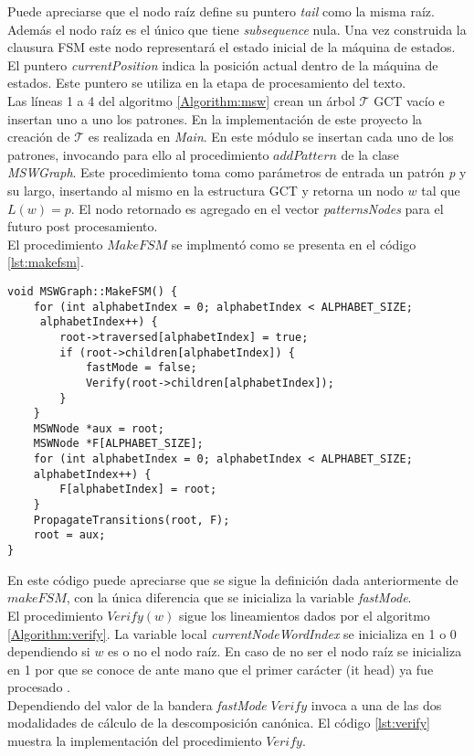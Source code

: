 Puede apreciarse que el nodo raíz define su puntero {\it tail} como la misma raíz. Además el nodo raíz es el único que tiene {\it subsequence} nula. 
Una vez construida la clausura FSM este nodo representará el estado inicial de la máquina de estados. \\
El puntero {\it currentPosition} indica la posición actual dentro de la máquina de estados. Este puntero se utiliza en la etapa de procesamiento del texto.\\
Las líneas 1 a 4 del algoritmo \ref{Algorithm:msw} crean un árbol $\mathcal{T}$ GCT vacío e insertan uno a uno los patrones. En la implementación de este proyecto la creación de $\mathcal{T}$ es realizada en \emph{Main}. En este módulo se insertan cada uno de los patrones, invocando para ello al procedimiento $addPattern$ de la clase \emph{MSWGraph}. Este procedimiento toma como parámetros de entrada un patrón \emph{p} y su largo, insertando al mismo en la estructura GCT y retorna un nodo $w$ tal que $L(w) = p$. El nodo retornado es agregado en el vector {\it patternsNodes} para el futuro post procesamiento.\\
El procedimiento $MakeFSM$ se implmentó como se presenta en el código \ref{lst:makefsm}.
\begin{lstlisting}[caption=Procedimiento $MakeFSM$, label={lst:makefsm}]
void MSWGraph::MakeFSM() {
	for (int alphabetIndex = 0; alphabetIndex < ALPHABET_SIZE;
	 alphabetIndex++) {
		root->traversed[alphabetIndex] = true;
		if (root->children[alphabetIndex]) {
			fastMode = false;
			Verify(root->children[alphabetIndex]);
		}
	}
	MSWNode *aux = root;
	MSWNode *F[ALPHABET_SIZE];
	for (int alphabetIndex = 0; alphabetIndex < ALPHABET_SIZE;
	alphabetIndex++) {
		F[alphabetIndex] = root;
	}
	PropagateTransitions(root, F);
	root = aux;
}
\end{lstlisting}
En este código puede apreciarse que se sigue la definición dada anteriormente de $makeFSM$, con la única diferencia que se inicializa la variable {\it fastMode}.\\
El procedimiento $Verify(w)$ sigue los lineamientos dados por el algoritmo \ref{Algorithm:verify}. 
La variable local {\it currentNodeWordIndex} se inicializa en 1 o 0 dependiendo si $w$ es o no el nodo raíz. En caso de no ser el nodo raíz se inicializa en 1 por que se conoce de ante mano que el primer carácter ({it head}) ya fue procesado .\\ 
Dependiendo del valor de la bandera {\it fastMode} $Verify$ invoca a una de las dos modalidades de cálculo de la descomposición canónica. El código \ref{lst:verify} muestra la implementación del procedimiento $Verify$.
